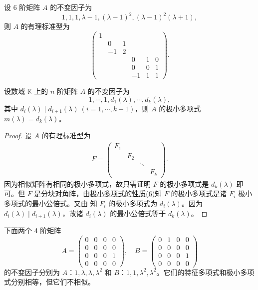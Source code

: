 \documentclass[../../main.tex]{subfiles}
\begin{document}
\begin{example}
设 6 阶矩阵 $A$ 的不变因子为
\[
1,1,1,\lambda - 1,(\lambda - 1)^2,(\lambda - 1)^2(\lambda + 1),
\]
则 $A$ 的有理标准型为
\[
\begin{pmatrix}
1 & & & & & \\
& 0 & 1 & & & \\
& -1 & 2 & & & \\
& & & 0 & 1 & 0 \\
& & & 0 & 0 & 1 \\
& & & -1 & 1 & 1
\end{pmatrix}.
\] 
\end{example}

\begin{theorem}\label{theorem:极小多项式与不变因子的关系}
设数域 $\mathbb{K}$ 上的 $n$ 阶矩阵 $A$ 的不变因子为
\[
1,\cdots,1,d_1(\lambda),\cdots,d_k(\lambda),
\]
其中 $d_i(\lambda)\mid d_{i + 1}(\lambda)\ (i = 1,\cdots,k - 1)$，则 $A$ 的极小多项式 $m(\lambda)=d_k(\lambda)$。
\end{theorem}
\begin{proof}
设 $A$ 的有理标准型为
\begin{align*}
F = \begin{pmatrix}
F_1 & & & \\
& F_2 & & \\
& & \ddots & \\
& & & F_k
\end{pmatrix}.
\end{align*}
因为相似矩阵有相同的极小多项式，故只需证明 $F$ 的极小多项式是 $d_k(\lambda)$ 即可。但 $F$ 是分块对角阵，由\hyperref[proposition:极小多项式的性质]{极小多项式的性质(6)}知 $F$ 的极小多项式是诸 $F_i$ 极小多项式的最小公倍式。又由 知 $F_i$ 的极小多项式为 $d_i(\lambda)$。因为 $d_i(\lambda)\mid d_{i + 1}(\lambda)$，故诸 $d_i(\lambda)$ 的最小公倍式等于 $d_k(\lambda)$。
\end{proof}

\begin{example}
下面两个 4 阶矩阵
\[
A = \begin{pmatrix}
0 & 0 & 0 & 0 \\
0 & 0 & 0 & 0 \\
0 & 0 & 0 & 1 \\
0 & 0 & 0 & 0
\end{pmatrix}, \quad
B = \begin{pmatrix}
0 & 1 & 0 & 0 \\
0 & 0 & 0 & 0 \\
0 & 0 & 0 & 1 \\
0 & 0 & 0 & 0
\end{pmatrix}
\]
的不变因子分别为 $A$：$1,\lambda,\lambda,\lambda^2$ 和 $B$：$1,1,\lambda^2,\lambda^2$。它们的特征多项式和极小多项式分别相等，但它们不相似。 
\end{example}
\end{document}
